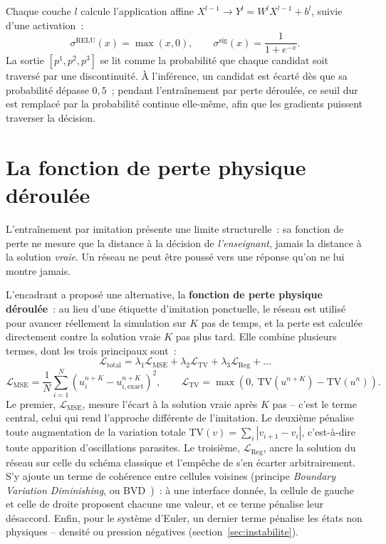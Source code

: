 \documentclass[12pt,a4paper,oneside]{report}
\begin{document}
Chaque couche $l$ calcule l'application affine $X^{l-1} \to Y^l = W^l X^{l-1} +
b^l$, suivie d'une activation~:
\[
\sigma^{\text{RELU}}(x) = \max(x, 0), \qquad
\sigma^{\text{sig}}(x) = \frac{1}{1+e^{-x}}.
\]
La sortie $[p^1,p^2,p^3]$ se lit comme la probabilité que chaque candidat soit
traversé par une discontinuité. À l'inférence, un candidat est écarté dès que
sa probabilité dépasse $0{,}5$~; pendant l'entraînement par perte déroulée, ce
seuil dur est remplacé par la probabilité continue elle-même, afin que les
gradients puissent traverser la décision.

\section{La fonction de perte physique déroulée}
\label{sec:perte}

L'entraînement par imitation présente une limite structurelle~: sa fonction de
perte ne mesure que la distance à la décision de \emph{l'enseignant}, jamais la
distance à la solution \emph{vraie}. Un réseau ne peut être poussé vers une
réponse qu'on ne lui montre jamais.

L'encadrant a proposé une alternative, la \textbf{fonction de perte physique
déroulée}~: au lieu d'une étiquette d'imitation ponctuelle, le réseau est
utilisé pour avancer réellement la simulation sur $K$ pas de temps, et la
perte est calculée directement contre la solution vraie $K$ pas plus tard.
Elle combine plusieurs termes, dont les trois principaux sont~:
\[
\mathcal{L}_{\text{total}} = \lambda_1\mathcal{L}_{\text{MSE}}
+ \lambda_2\mathcal{L}_{\text{TV}}
+ \lambda_3\mathcal{L}_{\text{Reg}} + \dots
\]
\[
\mathcal{L}_{\text{MSE}} = \frac{1}{N}\sum_{i=1}^{N}\left(u_i^{n+K} - u_{i,\text{exact}}^{n+K}\right)^2,
\qquad
\mathcal{L}_{\text{TV}} = \max\left(0,\ \mathrm{TV}(u^{n+K}) - \mathrm{TV}(u^{n})\right).
\]
Le premier, $\mathcal{L}_{\text{MSE}}$, mesure l'écart à la solution vraie
après $K$ pas -- c'est le terme central, celui qui rend l'approche différente
de l'imitation. Le deuxième pénalise toute augmentation de la variation totale
$\mathrm{TV}(v) = \sum_i |v_{i+1}-v_i|$, c'est-à-dire toute apparition
d'oscillations parasites. Le troisième, $\mathcal{L}_{\text{Reg}}$, ancre la
solution du réseau sur celle du schéma classique et l'empêche de s'en écarter
arbitrairement. S'y ajoute un terme de cohérence entre cellules voisines
(principe \emph{Boundary Variation Diminishing}, ou BVD~\cite{fu2016})~: à une
interface donnée, la cellule de gauche et celle de droite proposent chacune
une valeur, et ce terme pénalise leur désaccord. Enfin, pour le système
d'Euler, un dernier terme pénalise les états non physiques -- densité ou
pression négatives (section~\ref{sec:instabilite}).
\end{document}
